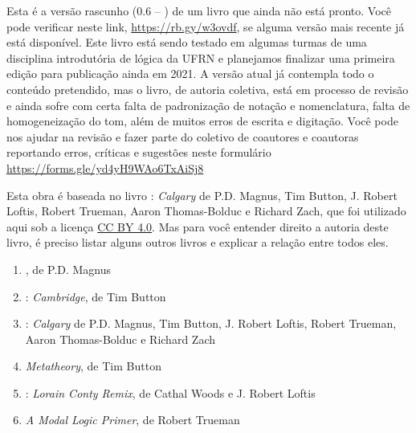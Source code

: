 \parbox{3 in}{
Esta é a versão rascunho (0.6 -- \mydate) de um livro que ainda não está pronto.
Você pode verificar neste link, \hbox{\url{https://rb.gy/w3ovdf}}, se alguma versão mais recente já está disponível.
Este livro está sendo testado em algumas turmas de uma disciplina introdutória de lógica da UFRN e planejamos finalizar uma primeira edição para publicação ainda em 2021. 
A versão atual já contempla todo o conteúdo pretendido, mas o livro, de autoria coletiva, está em processo de revisão e ainda sofre com certa falta de padronização de notação e nomenclatura, falta de homogeneização do tom, além de muitos erros de escrita e digitação.
Você pode nos ajudar na revisão e fazer parte do coletivo de coautores e coautoras reportando erros, críticas e sugestões neste formulário
\hbox{\url{https://forms.gle/yd4yH9WAo6TxAiSj8}} 
}

\newpage

\noindent Esta obra é baseada no livro \forallx: \textit{Calgary} de P.D. Magnus, Tim Button, J. Robert Loftis, Robert Trueman, Aaron Thomas-Bolduc e Richard Zach, que foi utilizado aqui sob a licença \href{https://creativecommons.org/licenses/by/4.0/}{CC BY 4.0}.
Mas para você entender direito a autoria deste livro, é preciso listar alguns outros livros e explicar a relação entre todos eles.

\begin{enumerate}
   \item \forallx, de P.D. Magnus

   \item \forallx: \textit{Cambridge}, de Tim Button

   \item \forallx: \textit{Calgary} de P.D. Magnus, Tim Button, J. Robert Loftis, Robert Trueman, Aaron Thomas-Bolduc e Richard Zach
   
   \item \textit{Metatheory}, de Tim Button
   
   \item  \forallx: \textit{Lorain Conty Remix}, de Cathal Woods e J. Robert Loftis
   
   \item \textit{A Modal Logic Primer}, de Robert Trueman
\end{enumerate}

